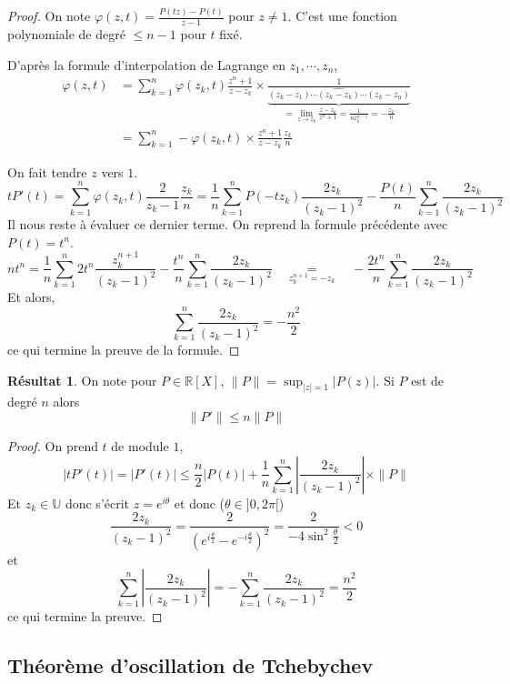\documentclass{article}
\theoremstyle{definition}
\newtheorem*{res}{Résultat}
\begin{document}
\begin{proof}
On note $\varphi(z, t)=\frac{P(tz)-P(t)}{z-1}$ pour $z\neq 1$. C'est une fonction polynomiale de degré $\leq n-1$ pour $t$ fixé.

D'après la formule d'interpolation de Lagrange en $z_1, \cdots, z_n$, \begin{align*}
    \varphi(z, t)&=\sum_{k=1}^n\varphi(z_k, t)\frac{z^n+1}{z-z_k} \times \underbrace{\frac1{(z_k-z_1)\cdots \widehat{(z_k-z_k)}\cdots (z_k-z_n)}}_{=\lim_{z\to z_k}\limits \frac{z-z_k}{z^n+1}=\frac1{nz_k^{n-1}}=-\frac{z_k}n} \\ &= \sum_{k=1}^n-\varphi(z_k, t)\times \frac{z^n+1}{z-z_k}\frac{z_k}n
\end{align*}

On fait tendre $z$ vers $1$. \[
    tP'(t)=\sum_{k=1}^n\varphi(z_k, t)\frac{2}{z_k-1}\frac{z_k}n= 
    \frac1n\sum_{k=1}^nP(-tz_k)\frac{2z_k}{(z_k-1)^2}-\frac{P(t)}{n}\sum_{k=1}^n\frac{2z_k}{(z_k-1)^2}
\]
Il nous reste à évaluer ce dernier terme. On reprend la formule précédente avec $P(t)=t^n$. \[
    nt^n=\frac1n\sum_{k=1}^n2t^n\frac{z_k^{n+1}}{(z_k-1)^2}-\frac{t^n}{n}\sum_{k=1}^n\frac{2z_k}{(z_k-1)^2}\quad \underset{z_k^{n+1}=-z_k}{=}\quad -\frac{2t^n}n\sum_{k=1}^n\frac{2z_k}{(z_k-1)^2}
\]
Et alors,
\[
\sum_{k=1}^n\frac{2z_k}{(z_k-1)^2}=-\frac{n^2}2
\]
ce qui termine la preuve de la formule.
\end{proof}

\begin{res}
On note pour $P\in\mathbb R[X]$, $\|P\|=\sup_{|z|=1}\limits|P(z)|$. Si $P$ est de degré $n$ alors \[
    \|P'\|\leq n\|P\|
\]
\end{res}

\begin{proof}
On prend $t$ de module $1$, \[
    |tP'(t)|=|P'(t)|\leq \frac n2|P(t)|+\frac1n\sum_{k=1}^n\left|\frac{2z_k}{(z_k-1)^2}\right|\times \|P\|
\]
Et $z_k\in\mathbb U$ donc s'écrit $z=e^{i\theta}$ et donc ($\theta\in ]0, 2\pi[$) \[
    \frac{2z_k}{(z_k-1)^2}=\frac{2}{(e^{i\frac \theta 2}-e^{-i\frac \theta2})^2}=\frac 2{-4\sin^2\frac\theta 2}<0
\]
et \[
    \sum_{k=1}^n\left|\frac{2z_k}{(z_k-1)^2}\right|=-\sum_{k=1}^n\frac{2z_k}{(z_k-1)^2}=\frac{n^2}2
\]
ce qui termine la preuve.
\end{proof}

\subsection{Théorème d'oscillation de Tchebychev}
\end{document}
